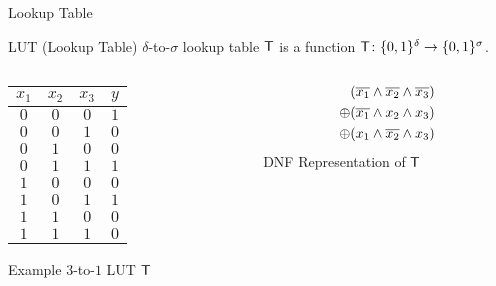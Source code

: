 \documentclass[../250326_cryptlab_flute_security.tex]{subfiles}
\begin{document}
\begin{frame}{Lookup Table}
    \def\onlyred{\only<2->{\color{red}}}
    \begin{block}{LUT (Lookup Table)}
        \(\delta\)-to-\(\sigma\) lookup table \(\mathsf{T}\) is a function
        \(\mathsf{T} \colon \{0,1\}^\delta \to \{0,1\}^\sigma\).
    \end{block}
    \begin{columns}
        \begin{column}{0.4\textwidth}
            \centering
            \begin{table}[H]
                \centering
                \begin{tabular}{ccc|c}
                    \(x_1\)       & \(x_2\)       & \(x_3\)       & \(y\)         \\ \hline
                    \onlyred\(0\) & \onlyred\(0\) & \onlyred\(0\) & \onlyred\(1\) \\
                    \(0\)         & \(0\)         & \(1\)         & \(0\)         \\
                    \(0\)         & \(1\)         & \(0\)         & \(0\)         \\
                    \onlyred\(0\) & \onlyred\(1\) & \onlyred\(1\) & \onlyred\(1\) \\
                    \(1\)         & \(0\)         & \(0\)         & \(0\)         \\
                    \onlyred\(1\) & \onlyred\(0\) & \onlyred\(1\) & \onlyred\(1\) \\
                    \(1\)         & \(1\)         & \(0\)         & \(0\)         \\
                    \(1\)         & \(1\)         & \(1\)         & \(0\)
                \end{tabular}
            \end{table}
            Example \(3\)-to-\(1\) LUT \(\mathsf{T}\)
        \end{column}
        \pause
        \begin{column}{0.4\textwidth}
            \small
            \centering
            \begin{align*}
                & (\overline{x_1} \land \overline{x_2} \land \overline{x_3}) \\
                \oplus & (\overline{x_1} \land x_2 \land x_3) \\
                \oplus & (x_1 \land \overline{x_2} \land x_3)
            \end{align*}
            {DNF Representation of \(\mathsf{T}\)}

\end{column}
\end{columns}
\end{frame}
\end{document}
